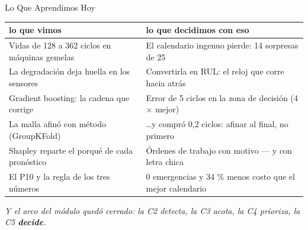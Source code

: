 \documentclass[aspectratio=169, 11pt]{beamer}
\begin{document}
\begin{frame}[shrink=10]{Lo Que Aprendimos Hoy}
  \vspace{-4pt}
  {\scriptsize
  \begin{center}
  \begin{tabular}{p{}p{}}
    \toprule
    \textbf{lo que vimos} & \textbf{lo que decidimos con eso} \\
    \midrule
    Vidas de 128 a 362 ciclos en máquinas gemelas & El calendario ingenuo pierde: 14 sorpresas de 25 \\[3pt]
    La degradación deja huella en los sensores & Convertirla en RUL: el reloj que corre hacia atrás \\[3pt]
    Gradient boosting: la cadena que corrige & Error de 5 ciclos en la zona de decisión (4$\times$ mejor) \\[3pt]
    La malla afinó con método (GroupKFold) & \ldots{}y compró 0,2 ciclos: afinar al final, no primero \\[3pt]
    Shapley reparte el porqué de cada pronóstico & Órdenes de trabajo con motivo --- y con letra chica \\[3pt]
    El P10 y la regla de los tres números & 0 emergencias y 34 \% menos costo que el mejor calendario \\
    \bottomrule
  \end{tabular}
  \end{center}}
  \vspace{6pt}
  {\scriptsize\color{arcaDark}\itshape
   Y el arco del módulo quedó cerrado: la C2 detecta, la C3 acota, la C4
   prioriza, la C5 \textbf{decide}.}
\end{frame}
\end{document}
